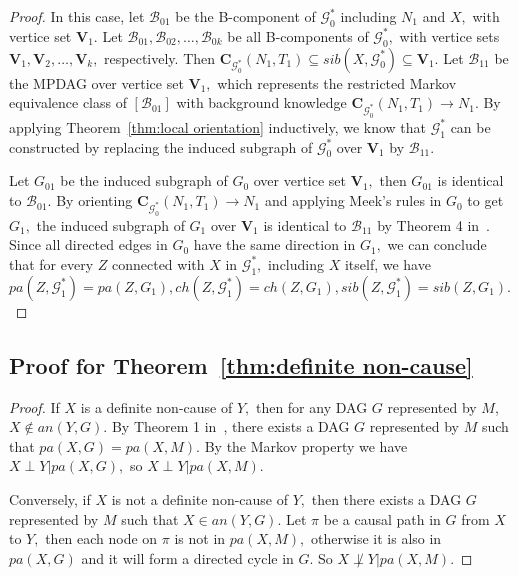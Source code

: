 \documentclass{article}
\begin{document}
\begin{proof}
In this case, let $\mathcal{B}_{01}$ be the B-component of $\mathcal{G}^*_0$ including $N_1$ and $X,$ with vertice set $\mathbf{V}_1.$ Let $\mathcal{B}_{01},\mathcal{B}_{02},\dots,\mathcal{B}_{0k}$ be all B-components of $\mathcal{G}^*_0,$ with vertice sets $\mathbf{V}_1,\mathbf{V}_2,\dots,\mathbf{V}_k,$ respectively. Then $\mathbf{C}_{\mathcal{G}^*_0}(N_1,T_1)\subseteq sib(X,\mathcal{G}^*_0)\subseteq \mathbf{V}_1.$ Let $\mathcal{B}_{11}$ be the MPDAG over vertice set $\mathbf{V}_1,$ which represents the restricted Markov equivalence class of $[\mathcal{B}_{01}]$ with background knowledge $\mathbf{C}_{\mathcal{G}^*_0}(N_1,T_1)\to N_1.$ By applying Theorem~\ref{thm:local orientation} inductively, we know that $\mathcal{G}^*_1$ can be constructed by replacing the induced subgraph of $\mathcal{G}^*_0$ over $\mathbf{V}_1$ by $\mathcal{B}_{11}.$ 

Let $G_{01}$ be the induced subgraph of $G_0$ over vertice set $\mathbf{V}_1,$ then $G_{01}$ is identical to $\mathcal{B}_{01}.$ By orienting $\mathbf{C}_{\mathcal{G}^*_0}(N_1,T_1)\to N_1$ and applying Meek's rules in $G_0$ to get $G_1,$ the induced subgraph of $G_1$ over $\mathbf{V}_1$ is identical to $\mathcal{B}_{11}$ by Theorem 4 in~\citet{meek1995causal}. Since all directed edges in $G_0$ have the same direction in $G_1,$ we can conclude that for every $Z$ connected with $X$ in $\mathcal{G}^*_1,$ including $X$ itself, we have $pa(Z,\mathcal{G}^*_1)=pa(Z,G_1), ch(Z,\mathcal{G}^*_1)=ch(Z,G_1), sib(Z,\mathcal{G}^*_1)=sib(Z,G_1).$

\end{proof}

\subsection{Proof for Theorem~\ref{thm:definite non-cause}}
\begin{proof}
If $X$ is a definite non-cause of $Y,$ then for any DAG $G$ represented by $M$, $X\not\in an(Y,G).$ By Theorem 1 in~\citep{fang2020ida}, there exists a DAG $G$ represented by $M$ such that $pa(X,G)=pa(X,M).$ By the Markov property we have $X\perp Y|pa(X,G),$ so $X\perp Y|pa(X,M).$

Conversely, if $X$ is not a definite non-cause of $Y,$ then there exists a DAG $G$ represented by $M$ such that $X\in an(Y,G).$ Let $\pi$ be a causal path in $G$ from $X$ to $Y,$ then each node on $\pi$ is not in $pa(X,M),$ otherwise it is also in $pa(X,G)$ and it will form a directed cycle in $G.$ So $X\not\perp Y|pa(X,M).$
\end{proof}
\end{document}
